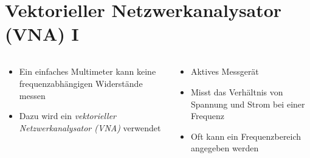 
\section{Vektorieller Netzwerkanalysator (VNA) I}
\label{section:vna_1}
\begin{frame}%

\begin{columns}
    \begin{column}{0.48\textwidth}
    \begin{itemize}
  \item Ein einfaches Multimeter kann keine frequenzabhängigen Widerstände messen
  \item Dazu wird ein \emph{vektorieller Netzwerkanalysator (VNA)} verwendet
  \end{itemize}

    \end{column}
   \begin{column}{0.48\textwidth}
       \begin{itemize}
  \item Aktives Messgerät
  \item Misst das Verhältnis von Spannung und Strom bei einer Frequenz
  \item Oft kann ein Frequenzbereich angegeben werden
  \end{itemize}

   \end{column}
\end{columns}

\end{frame}

